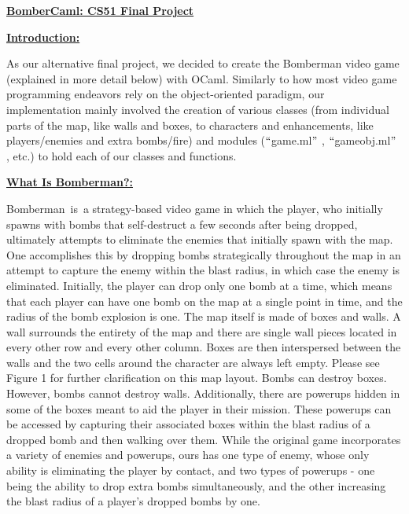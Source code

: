 \documentclass[12pt]{article}
\begin{document}
\begin{Center}
\textbf{\uline{BomberCaml: CS51 Final Project}}
\end{Center}\par


\vspace{\baselineskip}
\textbf{\uline{Introduction:}}\par

As our alternative final project, we decided to create the Bomberman video game (explained in more detail below) with OCaml. Similarly to how most video game programming endeavors rely on the object-oriented paradigm, our implementation mainly involved the creation of various classes (from individual parts of the map, like walls and boxes, to characters and enhancements, like players/enemies and extra bombs/fire) and modules ($``$game.ml$"$ , $``$gameobj.ml$"$ , etc.) to hold each of our classes and functions.\par


\vspace{\baselineskip}
\textbf{\uline{What Is Bomberman?:}}\par

Bomberman\ is\ a strategy-based video game in which the player, who initially spawns with bombs that self-destruct a few seconds after being dropped, ultimately attempts to eliminate the enemies that initially spawn with the map. One accomplishes this by dropping bombs strategically throughout the map in an attempt to capture the enemy within the blast radius, in which case the enemy is eliminated. Initially, the player can drop only one bomb at a time, which means that each player can have one bomb on the map at a single point in time, and the radius of the bomb explosion is one. The map itself is made of boxes and walls. A wall surrounds the entirety of the map and there are single wall pieces located in every other row and every other column. Boxes are then interspersed between the walls and the two cells around the character are always left empty.  Please see Figure 1 for further clarification on this map layout.  Bombs can destroy boxes. However, bombs cannot destroy walls. Additionally, there are powerups hidden in some of the boxes meant to aid the player in their mission. These powerups can be accessed by capturing their associated boxes within the blast radius of a dropped bomb and then walking over them. While the original game incorporates a variety of enemies and powerups, ours has one type of enemy, whose only ability is eliminating the player by contact, and two types of powerups - one being the ability to drop extra bombs simultaneously, and the other increasing the blast radius of a player’s dropped bombs by one.\par
\end{document}

